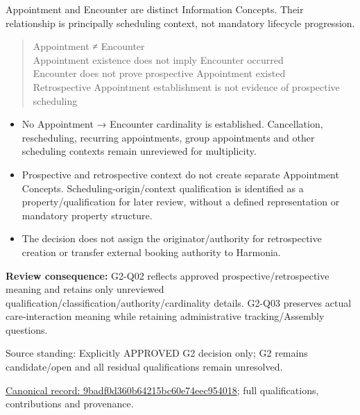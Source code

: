 Appointment and Encounter are distinct Information Concepts. Their relationship is principally scheduling context, not mandatory lifecycle progression.



\begin{quote}\small\ttfamily
Appointment ≠ Encounter\\
Appointment existence does not imply Encounter occurred\\
Encounter does not prove prospective Appointment existed\\
Retrospective Appointment establishment is not evidence of prospective scheduling\\

\end{quote}


\begin{itemize}


\item No Appointment → Encounter cardinality is established. Cancellation, rescheduling, recurring appointments, group appointments and other scheduling contexts remain unreviewed for multiplicity.

\item Prospective and retrospective context do not create separate Appointment Concepts. Scheduling-origin/context qualification is identified as a property/qualification for later review, without a defined representation or mandatory property structure.

\item The decision does not assign the originator/authority for retrospective creation or transfer external booking authority to Harmonia.

\end{itemize}


\textbf{Review consequence:} G2-Q02 reflects approved prospective/retrospective meaning and retains only unreviewed qualification/classification/authority/cardinality details. G2-Q03 preserves actual care-interaction meaning while retaining administrative tracking/Assembly questions.



Source standing: Explicitly APPROVED G2 decision only; G2 remains candidate/open and all residual qualifications remain unresolved.


{\footnotesize \href{../../../../continuum/application/data-object/topic/9badf0d360b64215bc60e74eec954018.md}{Canonical record: 9badf0d360b64215bc60e74eec954018}; full qualifications, contributions and provenance.}\par
